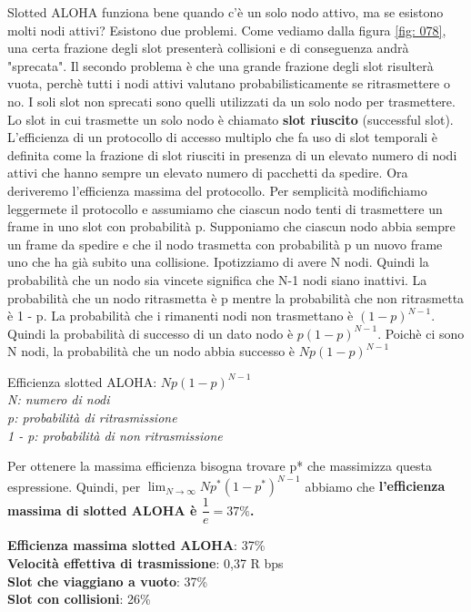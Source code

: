 \documentclass[11pt,a4paper]{book}
\begin{document}
Slotted ALOHA funziona bene quando c'è un solo nodo attivo, ma se esistono molti nodi attivi? Esistono due problemi. Come vediamo dalla figura \ref{fig: 078}, una certa frazione degli slot presenterà collisioni e di conseguenza andrà "sprecata". Il secondo problema è che una grande frazione degli slot risulterà vuota, perchè tutti i nodi attivi valutano probabilisticamente se ritrasmettere o no. I soli slot non sprecati sono quelli utilizzati da un solo nodo per trasmettere. Lo slot in cui trasmette un solo nodo è chiamato \textbf{slot riuscito} (successful slot). L'efficienza di un protocollo di accesso multiplo che fa uso di slot temporali è definita come la frazione di slot riusciti in presenza di un elevato numero di nodi attivi che hanno sempre un elevato numero di pacchetti da spedire. Ora deriveremo l'efficienza massima del  protocollo. Per semplicità modifichiamo leggermete il protocollo e assumiamo che ciascun nodo tenti di trasmettere un frame in uno slot con probabilità p. Supponiamo che ciascun nodo abbia sempre un frame da spedire e che il nodo trasmetta con probabilità p un nuovo frame  uno che ha già subito una collisione. Ipotizziamo di avere N nodi. Quindi la probabilità che un nodo sia vincete significa che N-1 nodi siano inattivi. La probabilità che un nodo ritrasmetta è p mentre la probabilità che non ritrasmetta è 1 - p. La probabilità che i rimanenti nodi non trasmettano è $(1 - p)^{N - 1}$. Quindi la probabilità di successo di un dato nodo è $p(1 - p)^{N - 1}$. Poichè ci sono N nodi, la probabilità che un nodo abbia successo è $Np(1 - p)^{N - 1}$
\begin{center}
	Efficienza slotted ALOHA: $Np(1 - p)^{N - 1}$ \\
	\textit{N: numero di nodi \\
		p: probabilità di ritrasmissione \\
		1 - p: probabilità di non ritrasmissione}
\end{center}
Per ottenere la massima efficienza bisogna trovare p* che massimizza questa espressione. Quindi, per $\lim_{N\to\infty} Np^{*}(1 - p^{*})^{N - 1}$ abbiamo che \textbf{l'efficienza massima di slotted ALOHA è $\dfrac{1}{e} =  37\%$.}
\begin{center}
	\textbf{Efficienza massima slotted ALOHA}: 37\% \\
	\textbf{Velocità effettiva di trasmissione}:  0,37 R bps \\
	\textbf{Slot che viaggiano a vuoto}: 37\% \\
	\textbf{Slot con collisioni}: 26\% \\ 
\end{center}
\end{document}
